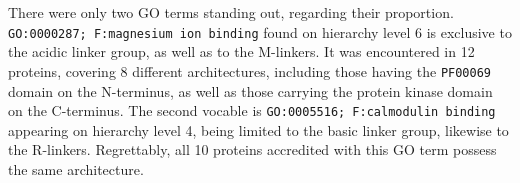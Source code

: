 		There were only two GO terms standing out, regarding their proportion.
		\texttt{GO:0000287; F:magnesium ion binding} found on hierarchy level 6 is exclusive
		to the acidic linker group, as well as to the M-linkers.
		It was encountered in 12 proteins, covering 8 different architectures, including those
		having the \texttt{PF00069} domain on the N-terminus, as well as those carrying the
		protein kinase domain on the C-terminus.
		The second vocable is \texttt{GO:0005516; F:calmodulin binding} appearing on hierarchy
		level 4, being limited to the basic linker group, likewise to the R-linkers.
		Regrettably, all 10 proteins accredited with this GO term possess the same
		architecture.

%
%
%
%
%
%
%
